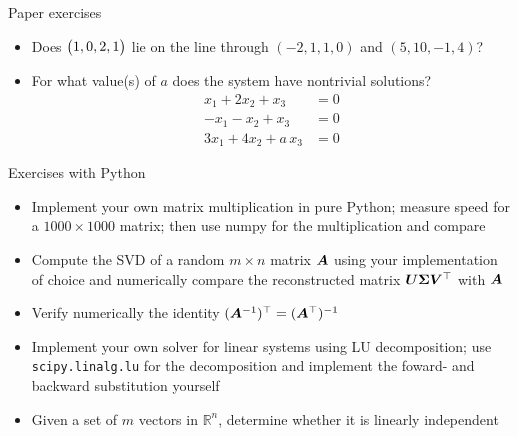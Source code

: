 
\begin{frame}{Paper exercises}
    \small
    \begin{itemize}
        \item Does $\mqty(1,0,2,1)$  lie on the line through \( (-2,1,1,0) \) and \( (5,10,-1,4) \)?
        \item For what value(s) of $a$ does the system have nontrivial solutions?
              \begin{align*}
                  x_1 + 2 x_2 + x_3      & = 0 \\
                  -x_1 - x_2 + x_3       & = 0 \\
                  3 x_1 + 4 x_2 + a\,x_3 & = 0
              \end{align*}

    \end{itemize}
\end{frame}

\begin{frame}{Exercises with Python}
    \small
    \begin{itemize}
        \item Implement your own matrix multiplication in pure Python; measure speed for a $1000 \times 1000$ matrix;
              then use numpy for the multiplication and compare
        \item Compute the SVD of a random $m \times n$ matrix $\bm{A}$ using your implementation of choice and
              numerically compare the reconstructed matrix $\bm{U} \bm{\Sigma} \bm{V}^\top$ with $\bm{A}$
        \item Verify numerically the identity $(\bm{A}^{-1})^\top = (\bm{A}^\top)^{-1}$
        \item Implement your own solver for linear systems using LU decomposition; use \texttt{scipy.linalg.lu}
              for the decomposition and implement the foward- and backward substitution yourself
        \item Given a set of $m$ vectors in $\mathbb{R}^n$, determine whether it is linearly independent
    \end{itemize}
\end{frame}
